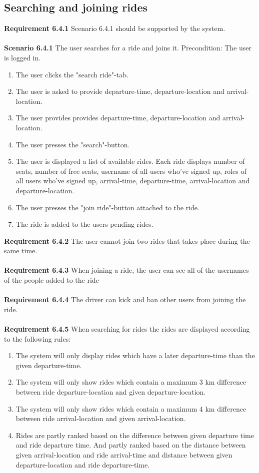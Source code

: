 \documentclass{article}
\begin{document}
\subsection{Searching and joining rides}
\textbf{Requirement 6.4.1} Scenario 6.4.1 should be supported by the system.
\\ \\
\textbf{Scenario 6.4.1} The user searches for a ride and joins it. Precondition: The user is logged in.
\begin{enumerate}
    \item The user clicks the "search ride"-tab.
    \item The user is asked to provide departure-time, departure-location and arrival-location. 
    \item The user provides provides departure-time, departure-location and arrival-location.
    \item The user presses the "search"-button.
    \item The user is displayed a list of available rides. Each ride displays number of seats, number of free seats, username of all users who've signed up, roles of all users who've signed up, arrival-time, departure-time, arrival-location and departure-location.  
    \item The user presses the "join ride"-button attached to the ride.
    \item The ride is added to the users pending rides.
\end{enumerate}
\textbf{Requirement 6.4.2} The user cannot join two rides that takes place during the same time.
\\ \\
\textbf{Requirement 6.4.3} When joining a ride, the user can see all of the usernames of the people added to the ride
\\ \\
\textbf{Requirement 6.4.4} The driver can kick and ban other users from joining the ride.
\\ \\
\textbf{Requirement 6.4.5} When searching for rides the rides are displayed according to the following rules:
\begin{enumerate}
    \item The system will only display rides which have a later departure-time than the given departure-time.
    \item The system will only show rides which contain a maximum 3 km difference between ride departure-location and given departure-location.
    \item The system will only show rides which contain a maximum 4 km difference between ride arrival-location and given arrival-location.
    \item Rides are partly ranked based on the difference between given departure time and ride departure time. And partly ranked based on the distance between given arrival-location and ride arrival-time and distance between given departure-location and ride departure-time. 
\end{enumerate}
\end{document}
